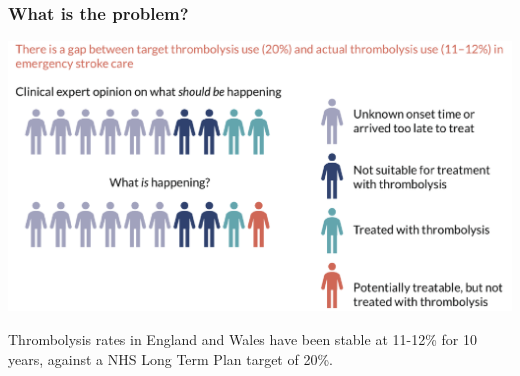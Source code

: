 \documentclass[xcolor={usenames,dvipsnames}]{beamer}
\begin{document}

\begin{frame}
\frametitle{What is the problem?}

\begin{center}
\includegraphics[width=1.0\textwidth]{./images/sam_summary_pt_1}
\end{center}

 
Thrombolysis rates in England and Wales have been stable at 11-12\% for 10 years, against a NHS Long Term Plan target of 20\%.



\end{frame}




\end{document}
